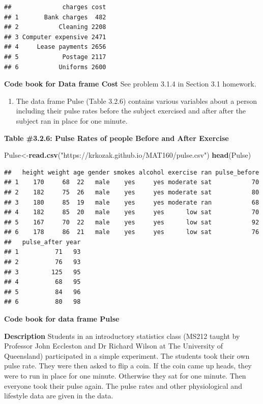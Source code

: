 \documentclass[]{book}
\newenvironment{Shaded}{\begin{snugshade}}{\end{snugshade}}
\newcommand{\KeywordTok}[1]{\textcolor[rgb]{0.13,0.29,0.53}{\textbf{#1}}}
\newcommand{\NormalTok}[1]{#1}
\newcommand{\StringTok}[1]{\textcolor[rgb]{0.31,0.60,0.02}{#1}}
\providecommand{\tightlist}{%
  \setlength{\itemsep}{0pt}\setlength{\parskip}{0pt}}
\begin{document}
\begin{verbatim}
##              charges cost
## 1       Bank charges  482
## 2           Cleaning 2208
## 3 Computer expensive 2471
## 4     Lease payments 2656
## 5            Postage 2117
## 6           Uniforms 2600
\end{verbatim}

\textbf{Code book for Data frame Cost} See problem 3.1.4 in Section 3.1 homework.

\begin{enumerate}
\def\labelenumi{\arabic{enumi}.}
\setcounter{enumi}{4}
\tightlist
\item
  The data frame Pulse (Table 3.2.6) contains various variables about a person including their pulse rates before the subject exercised and after after the subject ran in place for one minute.
\end{enumerate}

\textbf{Table \#3.2.6: Pulse Rates of people Before and After Exercise}

\begin{Shaded}
\begin{Highlighting}[]
\NormalTok{Pulse<-}\KeywordTok{read.csv}\NormalTok{(}\StringTok{"https://krkozak.github.io/MAT160/pulse.csv"}\NormalTok{)}
\KeywordTok{head}\NormalTok{(Pulse)}
\end{Highlighting}
\end{Shaded}

\begin{verbatim}
##   height weight age gender smokes alcohol exercise ran pulse_before
## 1    170     68  22   male    yes     yes moderate sat           70
## 2    182     75  26   male    yes     yes moderate sat           80
## 3    180     85  19   male    yes     yes moderate ran           68
## 4    182     85  20   male    yes     yes      low sat           70
## 5    167     70  22   male    yes     yes      low sat           92
## 6    178     86  21   male    yes     yes      low sat           76
##   pulse_after year
## 1          71   93
## 2          76   93
## 3         125   95
## 4          68   95
## 5          84   96
## 6          80   98
\end{verbatim}

\textbf{Code book for data frame Pulse}

\textbf{Description}
Students in an introductory statistics class (MS212 taught by Professor John Eccleston and Dr Richard Wilson at The University of Queensland) participated in a simple experiment. The students took their own pulse rate. They were then asked to flip a coin. If the coin came up heads, they were to run in place for one minute. Otherwise they sat for one minute. Then everyone took their pulse again. The pulse rates and other physiological and lifestyle data are given in the data.
\end{document}
